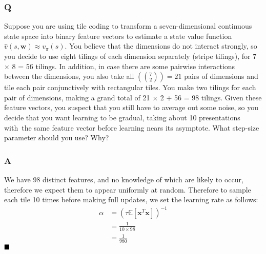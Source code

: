 \subsubsection{Q}
Suppose you are using tile coding to transform a seven-dimensional continuous state space into binary feature vectors to estimate a state value function $\hat{v}(s,\textbf{w}) \approx v_\pi(s)$. You believe that the dimensions do not interact strongly, so you decide to use eight tilings of each dimension separately (stripe tilings), for 7 $\times$ 8 = 56 tilings. In addition, in case there are some pairwise interactions between the dimensions, you also take all $(7 \choose 2) = 21$ pairs of dimensions and tile each pair conjunctively with rectangular tiles. You make two tilings for each pair of dimensions, making a grand total of 21 $\times$ 2 + 56 = 98 tilings. Given these feature vectors, you suspect that you still have to average out some noise, so you decide that you want learning to be gradual, taking about 10 presentations with the same feature vector before learning nears its asymptote. What step-size parameter should you use? Why?
\subsubsection{A}
We have 98 distinct features, and no knowledge of which are likely to occur, therefore we expect them to appear uniformly at random. Therefore to sample each tile 10 times before making full updates, we set the learning rate as follows:
\begin{align}
\alpha &= (\tau \mathbb{E}[\textbf{x}^T\textbf{x}])^{-1} \\
&= \frac{1}{10 \times 98} \\
&= \frac{1}{980}
\end{align}
$
\hfill \blacksquare
$